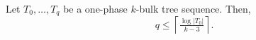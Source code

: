 \documentclass[10pt, conference, compsocconf]{IEEEtran}
\let\leq\leqslant
\newcommand{\itemref}[1]{(\ref{#1})}
\begin{document}

\begin{cor}
Let $T_0,\dots,T_{q}$ be a one-phase $k$-bulk tree sequence.
Then,
\[
q \leq \left\lceil\tfrac{\log|T_0|}{k-3}\right\rceil.
\]
\end{cor}
\end{document}
